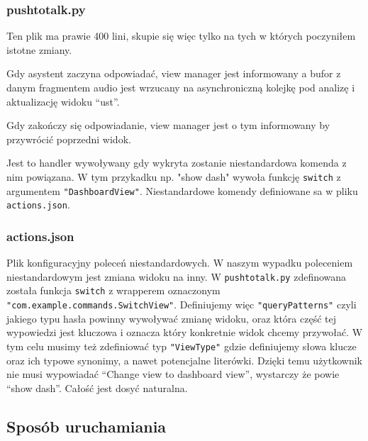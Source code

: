 \documentclass[declaration,shortabstract, inz]{iithesis}
\begin{document}
\subsubsection{pushtotalk.py}
Ten plik ma prawie 400 lini, skupie się więc tylko na tych w których poczyniłem istotne zmiany.

    Gdy asystent zaczyna odpowiadać, view manager jest informowany a bufor z danym fragmentem audio jest wrzucany na asynchroniczną kolejkę pod analizę i aktualizację widoku ``ust''.

    Gdy zakończy się odpowiadanie, view manager jest o tym informowany by przywrócić poprzedni widok.

    Jest to handler wywoływany gdy wykryta zostanie niestandardowa komenda z nim powiązana. W tym przykadku np. "show dash" wywoła funkcję \texttt{switch} z argumentem \texttt{"DashboardView"}. Niestandardowe komendy definiowane sa w pliku \texttt{actions.json}.



\subsubsection{actions.json}
% 
    Plik konfiguracyjny poleceń niestandardowych. W naszym wypadku poleceniem niestandardowym jest zmiana widoku na inny. W \texttt{pushtotalk.py} zdefinowana została funkcja \texttt{switch} z wrapperem oznaczonym \texttt{"com.example.commands.SwitchView"}. Definiujemy więc \texttt{"queryPatterns"} czyli jakiego typu hasła powinny wywoływać zmianę widoku, oraz która część tej wypowiedzi jest kluczowa i oznacza który konkretnie widok chcemy przywołać. W tym celu musimy też zdefiniować typ \texttt{"ViewType"} gdzie definiujemy słowa klucze oraz ich typowe synonimy, a nawet potencjalne literówki. Dzięki temu użytkownik nie musi wypowiadać ``Change view to dashboard view'', wystarczy że powie ``show dash''. Całość jest dosyć naturalna.
    
\subsection{Sposób uruchamiania}
\end{document}
